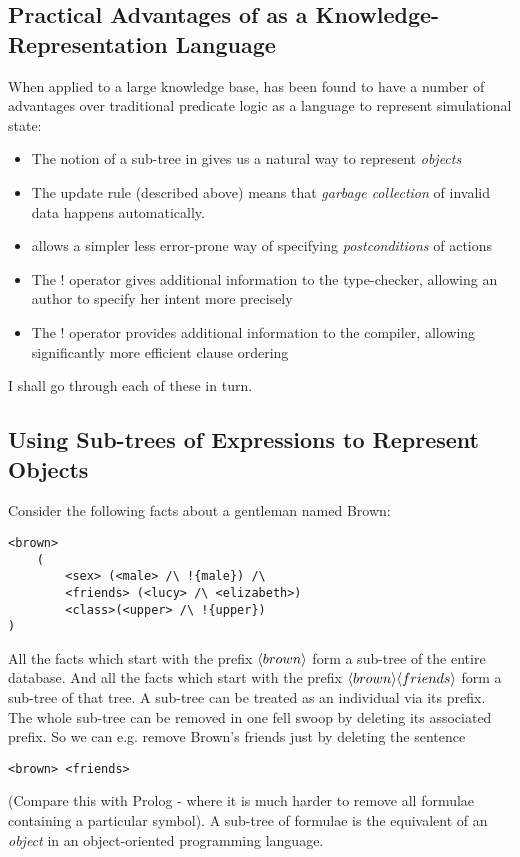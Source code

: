 \subsection{Practical Advantages of \ELABR{} as a Knowledge-Representation Language}

When applied to a large knowledge base, \ELFULL{} has been found to have a number of advantages over traditional predicate logic as a language to represent simulational state:
\begin{itemize}
\item
The notion of a sub-tree in \ELABR{} gives us a natural way to represent \emph{objects}
\item
The update rule (described above) means that \emph{garbage collection} of invalid data happens automatically.
\item
\ELABR{} allows a simpler less error-prone way of specifying \emph{postconditions} of actions
\item
The $!$ operator gives additional information to the type-checker, allowing an author to specify her intent more precisely
\item
The $!$ operator provides additional information to the compiler, allowing significantly more efficient clause ordering
\end{itemize}
I shall go through each of these in turn.

\subsection{Using Sub-trees of Expressions to Represent Objects}
Consider the following facts about a gentleman named Brown:
\begin{verbatim}
<brown>
    (
        <sex> (<male> /\ !{male}) /\
        <friends> (<lucy> /\ <elizabeth>)
        <class>(<upper> /\ !{upper})
)
\end{verbatim}
All the facts which start with the prefix $\MAY{brown}$ form a sub-tree of the entire database.
And all the facts which start with the prefix $\MAY{brown} \MAY{friends}$ form a sub-tree of that tree.
A sub-tree can be treated as an individual via its prefix.
The whole sub-tree can be removed in one fell swoop by deleting its associated prefix.
So we can e.g. remove Brown's friends just by deleting the sentence
\begin{verbatim}
<brown> <friends>
\end{verbatim}
(Compare this with Prolog - where it is much harder to remove all formulae containing a particular symbol).
A sub-tree of formulae is the \ELABR{} equivalent of an \emph{object} in an object-oriented programming language.

